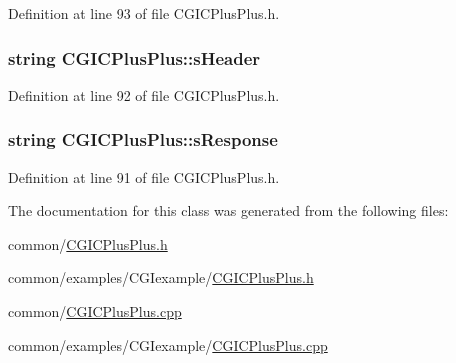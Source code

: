 \-Definition at line 93 of file \-C\-G\-I\-C\-Plus\-Plus.\-h.

\hypertarget{class_c_g_i_c_plus_plus_af469f49b966f4c8609c048115eab5a9b}{
\subsubsection[{s\-Header}]{\setlength{\rightskip}{0pt plus 5cm}string {\bf \-C\-G\-I\-C\-Plus\-Plus\-::s\-Header}}}\label{class_c_g_i_c_plus_plus_af469f49b966f4c8609c048115eab5a9b}


\-Definition at line 92 of file \-C\-G\-I\-C\-Plus\-Plus.\-h.

\hypertarget{class_c_g_i_c_plus_plus_af2082316224a148d5efb74b7567eaf45}{
\subsubsection[{s\-Response}]{\setlength{\rightskip}{0pt plus 5cm}string {\bf \-C\-G\-I\-C\-Plus\-Plus\-::s\-Response}}}\label{class_c_g_i_c_plus_plus_af2082316224a148d5efb74b7567eaf45}


\-Definition at line 91 of file \-C\-G\-I\-C\-Plus\-Plus.\-h.



\-The documentation for this class was generated from the following files\-:\begin{DoxyCompactItemize}
\item 
common/\hyperlink{_c_g_i_c_plus_plus_8h}{\-C\-G\-I\-C\-Plus\-Plus.\-h}\item 
common/examples/\-C\-G\-Iexample/\hyperlink{examples_2_c_g_iexample_2_c_g_i_c_plus_plus_8h}{\-C\-G\-I\-C\-Plus\-Plus.\-h}\item 
common/\hyperlink{_c_g_i_c_plus_plus_8cpp}{\-C\-G\-I\-C\-Plus\-Plus.\-cpp}\item 
common/examples/\-C\-G\-Iexample/\hyperlink{examples_2_c_g_iexample_2_c_g_i_c_plus_plus_8cpp}{\-C\-G\-I\-C\-Plus\-Plus.\-cpp}\end{DoxyCompactItemize}

